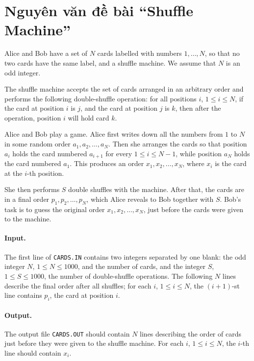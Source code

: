 \documentclass[11pt]{article}
\begin{document}
\appendix
\section{Nguyên văn đề bài ``Shuffle Machine''}

Alice and Bob have a set of \(N\) cards labelled with numbers \(1,\ldots,N\),
so that no two cards have the same label, and a shuffle machine. We assume
that \(N\) is an odd integer.

The shuffle machine accepts the set of cards arranged in an arbitrary order and
performs the following double-shuffle operation: for all positions \(i\),
\(1\le i\le N\), if the card at position \(i\) is \(j\), and the card at
position \(j\) is \(k\), then after the operation, position \(i\) will hold
card \(k\).

Alice and Bob play a game. Alice first writes down all the numbers from \(1\)
to \(N\) in some random order \(a_1,a_2,\ldots,a_N\). Then she arranges the
cards so that position \(a_i\) holds the card numbered \(a_{i+1}\) for every
\(1\le i\le N-1\), while position \(a_N\) holds the card numbered \(a_1\).
This produces an order \(x_1,x_2,\ldots,x_N\), where \(x_i\) is the card at
the \(i\)-th position.

She then performs \(S\) double shuffles with the machine. After that, the cards
are in a final order \(p_1,p_2,\ldots,p_N\), which Alice reveals to Bob
together with \(S\). Bob's task is to guess the original order
\(x_1,x_2,\ldots,x_N\), just before the cards were given to the machine.

\paragraph{Input.}
The first line of \texttt{CARDS.IN} contains two integers separated by one
blank: the odd integer \(N\), \(1\le N\le 1000\), and the number of cards, and
the integer \(S\), \(1\le S\le 1000\), the number of double-shuffle operations.
The following \(N\) lines describe the final order after all shuffles; for each
\(i\), \(1\le i\le N\), the \((i+1)\)-st line contains \(p_i\), the card at
position \(i\).

\paragraph{Output.}
The output file \texttt{CARDS.OUT} should contain \(N\) lines describing the
order of cards just before they were given to the shuffle machine. For each
\(i\), \(1\le i\le N\), the \(i\)-th line should contain \(x_i\).
\end{document}
